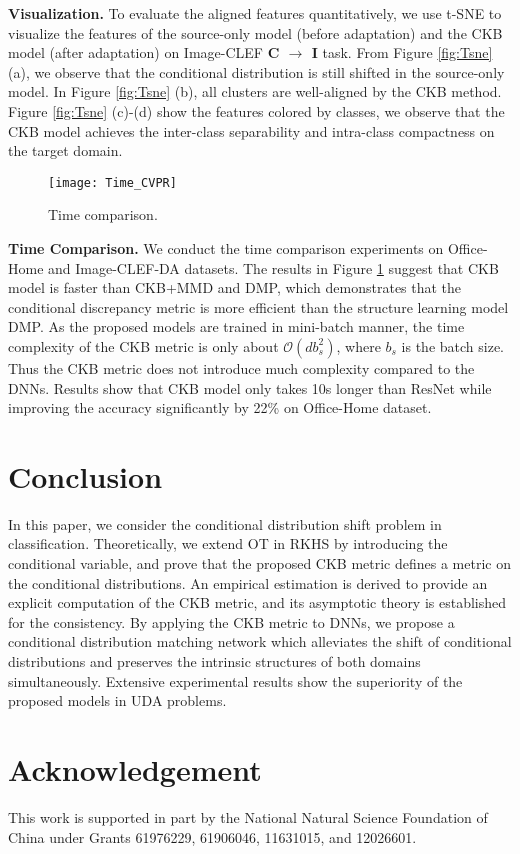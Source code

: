 \documentclass[final]{cvpr}
\newcommand{\MC}{\mathcal}
\begin{document}

\textbf{Visualization.} To evaluate the aligned features quantitatively, we use t-SNE \cite{maaten2008visualizing} to visualize the features of the source-only model (before adaptation) and the CKB model (after adaptation) on Image-CLEF \textbf{C $\to$ I} task. From Figure \ref{fig:Tsne} (a), we observe that the conditional distribution is still shifted in the source-only model. In Figure \ref{fig:Tsne} (b), all clusters are well-aligned by the CKB method. Figure \ref{fig:Tsne} (c)-(d) show the features colored by classes, we observe that the CKB model achieves the inter-class separability and intra-class compactness on the target domain.

\begin{figure}
\centering
\texttt{[image: Time\_CVPR]}
\caption{Time comparison.}\label{fig:time_comparison}
\vspace{-9pt}
\end{figure}

\textbf{Time Comparison.} We conduct the time comparison experiments on Office-Home and Image-CLEF-DA datasets. The results in Figure \ref{fig:time_comparison} suggest that CKB model is faster than CKB+MMD and DMP, which demonstrates that the conditional discrepancy metric is more efficient than the structure learning model DMP. As the proposed models are trained in mini-batch manner, the time complexity of the CKB metric is only about $\MC{O}(db_s^2)$, where $b_s$ is the batch size. Thus the CKB metric does not introduce much complexity compared to the DNNs. Results show that CKB model only takes 10s longer than ResNet while improving the accuracy significantly by 22\% on Office-Home dataset.

\section{Conclusion}
In this paper, we consider the conditional distribution shift problem in classification. Theoretically, we extend OT in RKHS by introducing the conditional variable, and prove that the proposed CKB metric defines a metric on the conditional distributions. An empirical estimation is derived to provide an explicit computation of the CKB metric, and its asymptotic theory is established for the consistency. By applying the CKB metric to DNNs, we propose a conditional distribution matching network which alleviates the shift of conditional distributions and preserves the intrinsic structures of both domains simultaneously. Extensive experimental results show the superiority of the proposed models in UDA problems.

\section*{Acknowledgement}
This work is supported in part by the National Natural Science Foundation of China under Grants 61976229, 61906046, 11631015, and 12026601.

{\small


}
\end{document}
